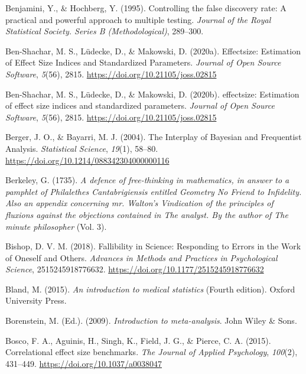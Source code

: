 \documentclass[
  oneside]{krantz}
\newlength{\cslhangindent}
\newlength{\cslentryspacingunit} %
\newenvironment{CSLReferences}[2] %
 {%
  \setlength{\parindent}{0pt}
  \ifodd #1
  \let\oldpar\par
  \def\par{\hangindent=\cslhangindent\oldpar}
  \fi
  \setlength{\parskip}{#2\cslentryspacingunit}
 }%
 {}
\begin{document}
\begin{CSLReferences}{1}{0}
\leavevmode{}%
Benjamini, Y., \& Hochberg, Y. (1995). Controlling the false discovery
rate: A practical and powerful approach to multiple testing.
\emph{Journal of the Royal Statistical Society. Series B
(Methodological)}, 289--300.

\leavevmode{}%
Ben-Shachar, M. S., Lüdecke, D., \& Makowski, D. (2020a). Effectsize:
{Estimation} of {Effect Size Indices} and {Standardized Parameters}.
\emph{Journal of Open Source Software}, \emph{5}(56), 2815.
\url{https://doi.org/10.21105/joss.02815}

\leavevmode{}%
Ben-Shachar, M. S., Lüdecke, D., \& Makowski, D. (2020b). {e}ffectsize:
Estimation of effect size indices and standardized parameters.
\emph{Journal of Open Source Software}, \emph{5}(56), 2815.
\url{https://doi.org/10.21105/joss.02815}

\leavevmode{}%
Berger, J. O., \& Bayarri, M. J. (2004). The {Interplay} of {Bayesian}
and {Frequentist Analysis}. \emph{Statistical Science}, \emph{19}(1),
58--80. \url{https://doi.org/10.1214/088342304000000116}

\leavevmode{}%
Berkeley, G. (1735). \emph{A defence of free-thinking in mathematics, in
answer to a pamphlet of {Philalethes Cantabrigiensis} entitled {Geometry
No Friend} to {Infidelity}. {Also} an appendix concerning mr. {Walton}'s
{Vindication} of the principles of fluxions against the objections
contained in {The} analyst. {By} the author of {The} minute philosopher}
(Vol. 3).

\leavevmode{}%
Bishop, D. V. M. (2018). Fallibility in {Science}: {Responding} to
{Errors} in the {Work} of {Oneself} and {Others}. \emph{Advances in
Methods and Practices in Psychological Science}, 2515245918776632.
\url{https://doi.org/10.1177/2515245918776632}

\leavevmode{}%
Bland, M. (2015). \emph{An introduction to medical statistics} (Fourth
edition). {Oxford University Press}.

\leavevmode{}%
Borenstein, M. (Ed.). (2009). \emph{Introduction to meta-analysis}.
{John Wiley \& Sons}.

\leavevmode{}%
Bosco, F. A., Aguinis, H., Singh, K., Field, J. G., \& Pierce, C. A.
(2015). Correlational effect size benchmarks. \emph{The Journal of
Applied Psychology}, \emph{100}(2), 431--449.
\url{https://doi.org/10.1037/a0038047}


\end{CSLReferences}
\end{document}

